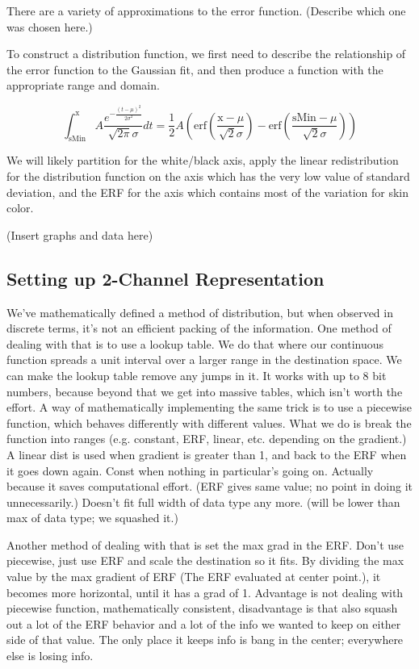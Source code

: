 \documentclass[10pt,a4paper]{article}
\begin{document}
There are a variety of approximations to the error function. (Describe which one was chosen here.)

To construct a distribution function, we first need to describe the relationship of the error function to the Gaussian fit, and then produce a function with the appropriate range and domain.

\begin{equation}\label{ErfDefinition}
  \int _{\text{sMin}}^{\text{x}} A \frac{e^{-\frac{(t-\mu )^2}{2 \sigma ^2}}}{\sqrt{2 \pi } \sigma }dt=\frac{1}{2} A \left(\text{erf}\left(\frac{\text{x}-\mu }{\sqrt{2} \sigma }\right)-\text{erf}\left(\frac{\text{sMin}-\mu }{\sqrt{2} \sigma }\right)\right)
\end{equation}



We will likely partition for the white/black axis, apply the linear redistribution for the distribution function on the axis which has the very low value of standard deviation, and the ERF for the axis which contains most of the variation for skin color.

(Insert graphs and data here)

\subsection{Setting up 2-Channel Representation}\label{sec:SettingUp2-ChannelRepresentation}
We've mathematically defined a method of distribution, but when observed in discrete terms, it's not an efficient packing of the information. One method of dealing with that is to use a lookup table. We do that where our continuous function spreads a unit interval over a larger range in the destination space. We can make the lookup table remove any jumps in it. It works with up to 8 bit numbers, because beyond that we get into massive tables, which isn't worth the effort. A way of mathematically implementing the same trick is to use a piecewise function, which behaves differently with different values. What we do is break the function into ranges (e.g. constant, ERF, linear, etc. depending on the gradient.) A linear dist is used when gradient is greater than 1, and back to the ERF when it goes down again. Const when nothing in particular's going on. Actually because it saves computational effort. (ERF gives same value; no point in doing it unnecessarily.) Doesn't fit full width of data type any more. (will be lower than max of data type; we squashed it.)

Another method of dealing with that is set the max grad in the ERF. Don't use piecewise, just use ERF and scale the destination so it fits. By dividing the max value by the max gradient of ERF (The ERF evaluated at center point.), it becomes more horizontal, until it has a grad of 1. Advantage is not dealing with piecewise function, mathematically consistent, disadvantage is that also squash out a lot of the ERF behavior and a lot of the info we wanted to keep on either side of that value. The only place it keeps info is bang in the center; everywhere else is losing info.
\end{document}
